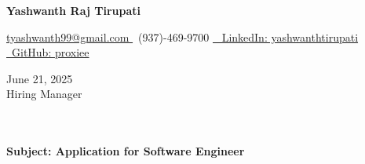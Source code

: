 \documentclass[letterpaper,11pt]{article}
\begin{document}
\begin{center}
    \textbf{\LARGE Yashwanth Raj Tirupati}
    \vspace{4pt}
    
    \small
    \href{mailto:tyashwanth99@gmail.com}{ tyashwanth99@gmail.com }\textbar
     ~(937)-469-9700 \textbar
    \href{https://linkedin.com/in/yashwanthtirupati}{~ LinkedIn: yashwanthtirupati }\textbar 
    \href{https://github.com/proxiee}{~GitHub: proxiee }
\end{center}

\vspace{20pt}

\begin{flushleft}
    June 21, 2025 \\
    \vspace{12pt}
    Hiring Manager \\
    [Company Name] \\
    [Location] \\
\end{flushleft}


\begin{flushleft}
\textbf{Subject: Application for Software Engineer}
\end{flushleft}


\end{document}
